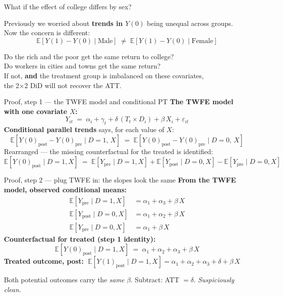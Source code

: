 \documentclass[aspectratio=169,11pt]{beamer}
\begin{document}
\begin{frame}{What if the effect of college differs by sex?}
\vspace{0.5em}
\begin{center}
Previously we worried about \textbf{trends in $Y(0)$} being unequal across groups.\\[0.5em]
Now the concern is different:
\[
\mathbb{E}[Y(1) - Y(0)\mid \text{Male}] \;\neq\; \mathbb{E}[Y(1) - Y(0)\mid \text{Female}]
\]
\end{center}
\vspace{0.4em}
\begin{center}\color{warmgray}\small
Do the rich and the poor get the same return to college?\\
Do workers in cities and towns get the same return?\\[0.4em]
If not, \textbf{and} the treatment group is imbalanced on these covariates,\\
the 2$\times$2 DiD will not recover the ATT.
\end{center}
\end{frame}

\begin{frame}{Proof, step 1 --- the TWFE model and conditional PT}
\vspace{0.3em}
\textbf{The TWFE model with one covariate $X$:}
\[
Y_{it} \;=\; \alpha_i + \gamma_t + \delta\,(T_t \times D_i) + \beta\, X_i + \varepsilon_{it}
\]
\textbf{Conditional parallel trends} says, for each value of $X$:
\[
\mathbb{E}[Y(0)_{\text{post}} - Y(0)_{\text{pre}} \mid D{=}1,\, X]
\;=\;
\mathbb{E}[Y(0)_{\text{post}} - Y(0)_{\text{pre}} \mid D{=}0,\, X]
\]
Rearranged --- the missing counterfactual for the treated is identified:
\[
\mathbb{E}[Y(0)_{\text{post}} \mid D{=}1, X]
\;=\;
\mathbb{E}[Y_{\text{pre}} \mid D{=}1, X]
+ \mathbb{E}[Y_{\text{post}} \mid D{=}0, X]
- \mathbb{E}[Y_{\text{pre}} \mid D{=}0, X]
\]
\end{frame}

\begin{frame}{Proof, step 2 --- plug TWFE in: the slopes look the same}
\vspace{0.3em}
\textbf{From the TWFE model, observed conditional means:}
\begin{align*}
\mathbb{E}[Y_{\text{pre}}  \mid D{=}1, X] &= \alpha_1 + \alpha_3 + \beta\, X \\[3pt]
\mathbb{E}[Y_{\text{post}} \mid D{=}0, X] &= \alpha_1 + \alpha_2 + \beta\, X \\[3pt]
\mathbb{E}[Y_{\text{pre}}  \mid D{=}0, X] &= \alpha_1 + \beta\, X
\end{align*}
\textbf{Counterfactual for treated (step 1 identity):}
\[
\mathbb{E}[Y(0)_{\text{post}} \mid D{=}1, X] \;=\; \alpha_1 + \alpha_2 + \alpha_3 + \beta\, X
\]
\textbf{Treated outcome, post:} $\;\mathbb{E}[Y(1)_{\text{post}} \mid D{=}1, X] = \alpha_1 + \alpha_2 + \alpha_3 + \delta + \beta\, X$\\[0.4em]
\begin{center}\color{warmgray}\small
Both potential outcomes carry the \textit{same} $\beta$. Subtract: ATT $= \delta$. \textit{Suspiciously clean.}
\end{center}
\end{frame}
\end{document}
